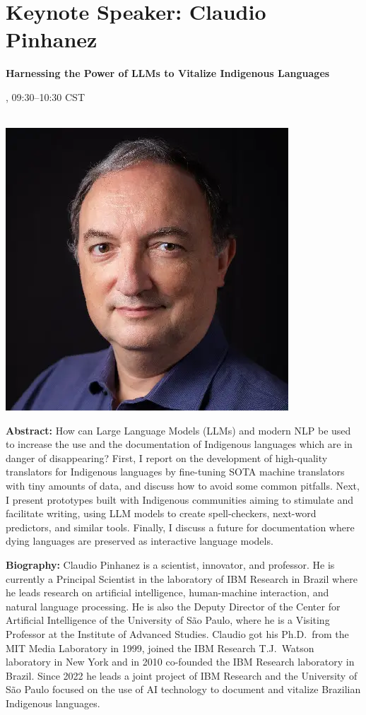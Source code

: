 \newpage
\section{Keynote Speaker: Claudio Pinhanez}

\begin{center}
\begin{Large}
{\bfseries\Large 
Harnessing the Power of LLMs to Vitalize Indigenous Languages
}\vspace{1em}
\end{Large}

\daydateyear, 09:30--10:30 CST \vspace{1em}\\
\PlenaryLoc \\
\vspace{1em}\par
\includegraphics[width=0.4\linewidth]{content/day1/claudio-headshot.png}
\end{center}

\noindent
{\bfseries Abstract:} How can Large Language Models (LLMs) and modern NLP be used to increase the use and the documentation of Indigenous languages which are in danger of disappearing? First, I report on the development of high-quality translators for Indigenous languages by fine-tuning SOTA machine translators with tiny amounts of data, and discuss how to avoid some common pitfalls. Next, I present prototypes built with Indigenous communities aiming to stimulate and facilitate writing, using LLM models to create spell-checkers, next-word predictors, and similar tools. Finally, I discuss a future for documentation where dying languages are preserved as interactive language models.

\vspace{1em}

{\bfseries Biography:} 
Claudio Pinhanez is a scientist, innovator, and professor. He is currently a Principal Scientist in the laboratory of IBM Research in Brazil where he leads research on artificial intelligence, human-machine interaction, and natural language processing. He is also the Deputy Director of the Center for Artificial Intelligence of the University of S\~ao Paulo, where he is a Visiting Professor at the Institute of Advanced Studies. Claudio got his Ph.D.~from the MIT Media Laboratory in 1999, joined the IBM Research T.J.~Watson laboratory in New York and in 2010 co-founded the IBM Research laboratory in Brazil. Since 2022 he leads a joint project of IBM Research and the University of S\~ao Paulo focused on the use of AI technology to document and vitalize Brazilian Indigenous languages.

\newpage
